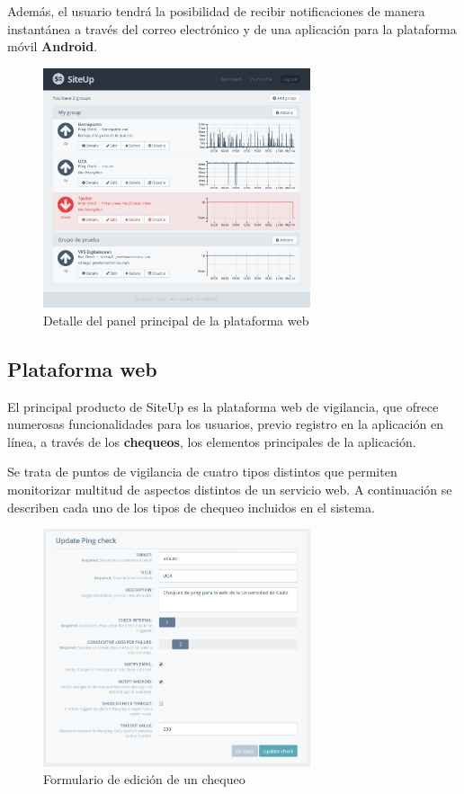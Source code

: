 \documentclass[a4paper,12pt]{article}
\begin{document}
Además, el usuario tendrá la posibilidad de recibir notificaciones de manera
instantánea a través del correo electrónico y de una aplicación para la
plataforma móvil \textbf{Android}. 


\begin{figure}[hbt]
  \centering
  \includegraphics[width=0.7\textwidth]{detalle_dashboard}
  \caption{Detalle del panel principal de la plataforma web}
  \label{fig:detalle_dashboard}
\end{figure}

\subsection{Plataforma web}

El principal producto de SiteUp es la plataforma web de vigilancia, que ofrece
numerosas funcionalidades para los usuarios, previo registro en la aplicación en
línea, a través de los \textbf{chequeos}, los elementos principales de la
aplicación. 

Se trata de puntos de vigilancia de cuatro tipos distintos que permiten
monitorizar multitud de aspectos distintos de un servicio web. A continuación se
describen cada uno de los tipos de chequeo incluidos en el sistema.

\begin{figure}[t]
  \centering
  \includegraphics[width=0.7\textwidth]{detalle_formulario_chequeo}
  \caption{Formulario de edición de un chequeo}
  \label{fig:formulario_detalle_chequeo}
\end{figure}
\end{document}
